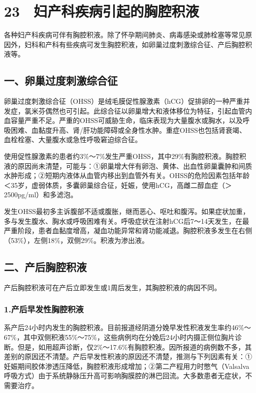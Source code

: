 \protect\hypertarget{text00075.html}{}{}

\section{23　妇产科疾病引起的胸腔积液}

各种妇产科疾病可伴有胸腔积液。除了怀孕期间肺炎、病毒感染或肺栓塞等常见原因外，妇科和产科有些疾病可发生胸腔积液，如卵巢过度刺激综合征、产后胸腔积液等。

\subsection{一、卵巢过度刺激综合征}

卵巢过度刺激综合征（OHSS）是绒毛膜促性腺激素（hCG）促排卵的一种严重并发症，氯米芬偶然也可引起。此综合征以卵巢增大和液体移位为特征，引起血管内血容量严重不足。严重的OHSS可威胁生命，临床表现为大量腹水或胸水，以及呼吸困难、血黏度升高、肾/肝功能障碍或全身性水肿。重症OHSS也包括肾衰竭、血栓栓塞、大量腹水或急性呼吸窘迫综合征。

使用促性腺激素的患者约3\%～7\%发生严重OHSS，其中29\%有胸腔积液。胸腔积液的原因尚未清楚，可能与：①卵巢增大伴有卵泡、黄体、出血性卵巢囊肿和间质水肿形成；②短期内液体从血管内移出到血管外有关。OHSS的危险因素包括年龄＜35岁，虚弱体质，多囊卵巢综合征，妊娠，使用hCG，高雌二醇血症（＞2500pg/ml）和多滤泡。

发生OHSS最初多主诉腹部不适或腹胀，继而恶心、呕吐和腹泻。如果症状加重，多与发生腹水、胸水或呼吸困难有关。呼吸症状在注射hCG后7～14天发生，在最严重阶段，患者血黏度增高，凝血功能异常和肾功能减退。胸腔积液多发生在右侧（53\%），左侧18\%，双侧29\%。积液为渗出液。

\subsection{二、产后胸腔积液}

产后胸腔积液可在产后立即发生或1周后发生，其胸腔积液的病因不同。

\subsubsection{1.产后早发性胸腔积液}

系产后24小时内发生的胸腔积液。目前报道经阴道分娩早发性积液发生率约46\%～67\%，其中双侧积液55\%～75\%，这些病例均在分娩后24小时内摄正侧位胸片诊断。但是，如用超声诊断，仅2\%～17.6\%有胸腔积液。因所报道的病例数不多，其差别的原因还不清楚。产后早发性积液的原因还不清楚，推测与下列因素有关：①妊娠期间胶体渗透压降低，胸腔积液形成增加；②第二产程用力时憋气（Valsalva呼吸方式）由于系统静脉压升高可影响胸膜腔的淋巴回流。大多数患者无症状，不需要治疗。

